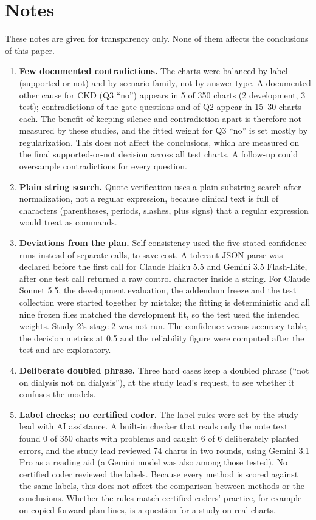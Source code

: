 \documentclass[10pt,letterpaper]{article}
\begin{document}
\section*{Notes}
\noindent These notes are given for transparency only. None of them affects the conclusions of this paper.
\begin{enumerate}[label=\arabic*.,ref=\arabic*]
\item\label{note:contra} \textbf{Few documented contradictions.} The charts were balanced by label (supported or not) and by scenario family, not by answer type. A documented other cause for CKD (Q3 ``no'') appears in 5 of 350 charts (2 development, 3 test); contradictions of the gate questions and of Q2 appear in 15--30 charts each. The benefit of keeping silence and contradiction apart is therefore not measured by these studies, and the fitted weight for Q3 ``no'' is set mostly by regularization. This does not affect the conclusions, which are measured on the final supported-or-not decision across all test charts. A follow-up could oversample contradictions for every question.
\item\label{note:string} \textbf{Plain string search.} Quote verification uses a plain substring search after normalization, not a regular expression, because clinical text is full of characters (parentheses, periods, slashes, plus signs) that a regular expression would treat as commands.
\item\label{note:dev} \textbf{Deviations from the plan.} Self-consistency used the five stated-confidence runs instead of separate calls, to save cost. A tolerant JSON parse was declared before the first call for Claude Haiku 5.5 and Gemini 3.5 Flash-Lite, after one test call returned a raw control character inside a string. For Claude Sonnet 5.5, the development evaluation, the addendum freeze and the test collection were started together by mistake; the fitting is deterministic and all nine frozen files matched the development fit, so the test used the intended weights. Study 2's stage 2 was not run. The confidence-versus-accuracy table, the decision metrics at 0.5 and the reliability figure were computed after the test and are exploratory.
\item\label{note:doubled} \textbf{Deliberate doubled phrase.} Three hard cases keep a doubled phrase (``not on dialysis not on dialysis''), at the study lead's request, to see whether it confuses the models.
\item\label{note:coder} \textbf{Label checks; no certified coder.} The label rules were set by the study lead with AI assistance. A built-in checker that reads only the note text found 0 of 350 charts with problems and caught 6 of 6 deliberately planted errors, and the study lead reviewed 74 charts in two rounds, using Gemini 3.1 Pro as a reading aid (a Gemini model was also among those tested). No certified coder reviewed the labels. Because every method is scored against the same labels, this does not affect the comparison between methods or the conclusions. Whether the rules match certified coders' practice, for example on copied-forward plan lines, is a question for a study on real charts.

\end{enumerate}
\end{document}
